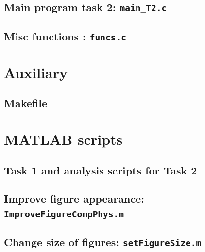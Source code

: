 %

\subsection{Main program task 2: \texttt{main\_T2.c}}



\subsection{Misc functions : \texttt{funcs.c}}


\section{Auxiliary }
\subsection{Makefile}


\section{MATLAB scripts}
\subsection{Task 1 and analysis scripts for Task 2}


\subsection{Improve figure appearance: \texttt{ImproveFigureCompPhys.m}}


\subsection{Change size of figures: \texttt{setFigureSize.m}}




